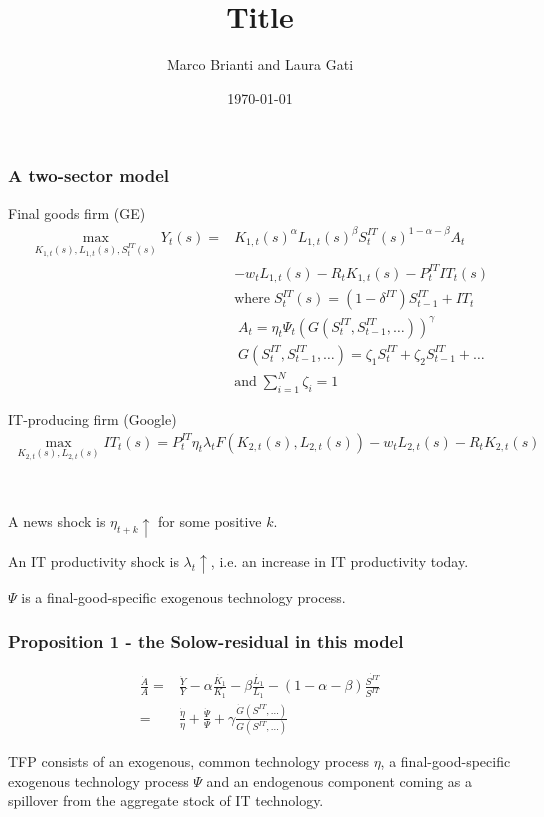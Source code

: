 \documentclass{beamer}
\author[Brianti, Gati]{Marco Brianti and Laura Gati}
\institute[Boston College]{Boston College}
\title{Title}
\date{\today}
\begin{document}
\begin{frame}

\maketitle


\end{frame}


\begin{frame}
\frametitle{A two-sector model}

Final goods firm (GE)
\begin{align*}
\max_{K_{1,t}(s), L_{1,t}(s), S^{IT}_t(s) } Y_t(s) =  & K_{1,t}(s)^{\alpha}L_{1,t}(s)^{\beta}S^{IT}_t(s)^{1-\alpha - \beta}A_t \\
 & - w_t L_{1,t}(s) -R_tK_{1,t}(s) -P^{IT}_t IT_t(s) \\
 & \text{where} \; S^{IT}_t(s) =  (1-\delta^{IT})S^{IT}_{t-1} + IT_t \\
 &  \; A_t =  \eta_t \Psi_t (G(S^{IT}_t,S^{IT}_{t-1},\dots))^{\gamma} \\
 &  \; G(S^{IT}_t,S^{IT}_{t-1},\dots) = \zeta_1 S_t^{IT} + \zeta_2 S^{IT}_{t-1} + \dots \\
  & \text{and} \; \sum_{i=1}^{N} \zeta_i = 1
\end{align*}

\end{frame}

\begin{frame}

IT-producing firm (Google)
\begin{align*}
\max_{K_{2,t}(s), L_{2,t}(s)} IT_t(s) = P^{IT}_t \eta_t \lambda_t F(K_{2,t}(s), L_{2,t}(s)) -w_t L_{2,t}(s) - R_t K_{2,t}(s)
\end{align*}

\

A news shock is $\eta_{t+k} \uparrow$ for some positive $k$. 

An IT productivity shock is $\lambda_{t} \uparrow$, i.e. an increase in IT productivity today. 

$\Psi$ is a final-good-specific exogenous technology process.

\end{frame}

\begin{frame}
\frametitle{Proposition 1 - the Solow-residual in this model}

\begin{align*}
\frac{\dot{A}}{A} = & \frac{\dot{Y}}{Y} - \alpha \frac{\dot{K_1}}{K_1} - \beta \frac{\dot{L_1}}{L_1} - (1-\alpha - \beta) \frac{\dot{S^{IT}}}{S^{IT}} \\
= & \frac{\dot{\eta}}{\eta} + \frac{\dot{\Psi}}{\Psi} + \gamma \frac{\dot{G}(S^{IT},\dots)}{G(S^{IT},\dots)}
\end{align*}

TFP consists of an exogenous, common technology process $\eta$, a final-good-specific exogenous technology process $\Psi$ and an endogenous component coming as a spillover from the aggregate stock of IT technology. 
\end{frame}
\end{document}
